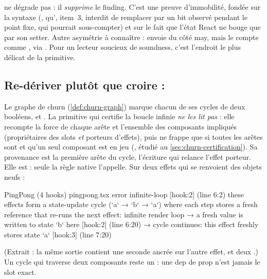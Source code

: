 \begin{piege}
 ne dégrade pas : il \emph{supprime} le finding. C'est une preuve d'immobilité, fondée sur la syntaxe (, qu', item~3, interdit de remplacer par un bit observé pendant le point fixe, qui pourrait sous-compter) et sur le fait que l'état React ne bouge que par son setter. Autre asymétrie à connaître :  envoie  du côté may, mais  le compte comme , via . Pour un lecteur soucieux de soundness, c'est l'endroit le plus délicat de la primitive.
\end{piege}

\subsection{Re-dériver plutôt que croire : }
\label{sec:api-regles-effect-cycle}

Le graphe de churn (\cref{def:churn-graph}) marque chacun de ses cycles de deux booléens,  et . La primitive qui certifie la boucle infinie \emph{ne les lit pas} : elle recompte la force de chaque arête et l'ensemble des composants impliqués (propriétaires des slots \emph{et} porteurs d'effets), puis ne frappe que si toutes les arêtes sont  et qu'un seul composant est en jeu (, étudié au \cref{sec:churn-certification}). Sa provenance est la première arête du cycle, l'écriture qui relance l'effet porteur. Elle est  : seule la règle native l'appelle. Sur deux effets qui se renvoient des objets neufs :

\begin{sortie}
  PingPong  (4 hooks)  pingpong.tsx
    error  infinite-loop  [hook:2]  (line 6:2)  these effects form a state-update cycle (`a` → `b` → `a`) where each step stores a fresh reference that re-runs the next effect: infinite render loop
       → a fresh value is written to state `b` here [hook:2] (line 6:20)
       → cycle continues: this effect freshly stores state `a` [hook:3] (line 7:20)
\end{sortie}

(Extrait : la même sortie contient une seconde \Error{} ancrée sur l'autre effet, et deux \Warning{} .) Un cycle qui traverse deux composants reste un \Warning{} : une dep de prop n'est jamais le slot exact.

